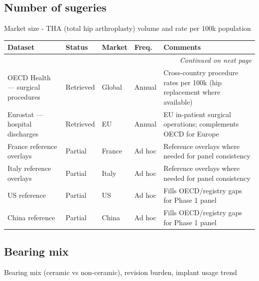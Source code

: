 \documentclass{article}
\begin{document}
\subsection{Number of sugeries}
Market size - THA (total hip arthroplasty) volume and rate per 100k population\\[0.5em]

\small
\setlength{\tabcolsep}{4pt}
\renewcommand{\arraystretch}{1.15}
\begin{longtable}{@{}p{3.0cm}p{2.0cm}p{2.1cm}p{1.9cm}p{5.8cm}@{}}
\toprule
\textbf{Dataset} & \textbf{Status} & \textbf{Market} & \textbf{Freq.} & \textbf{Comments} \\
\midrule
\endhead
\midrule
\multicolumn{5}{r}{\textit{Continued on next page}} \\
\endfoot
\bottomrule
\endlastfoot
OECD Health — surgical procedures & \textcolor{green!60!black}{Retrieved} & Global & Annual & Cross-country procedure rates per 100k (hip replacement where available) \\
Eurostat — hospital discharges & \textcolor{green!60!black}{Retrieved} & EU & Annual & EU in-patient surgical operations; complements OECD for Europe \\
France reference overlays & \textcolor{orange!85!black}{Partial} & France & Ad hoc & Reference overlays where needed for panel consistency \\
Italy reference overlays & \textcolor{orange!85!black}{Partial} & Italy & Ad hoc & Reference overlays where needed for panel consistency \\
US reference & \textcolor{orange!85!black}{Partial} & US & Ad hoc & Fills OECD/registry gaps for Phase 1 panel \\
China reference & \textcolor{orange!85!black}{Partial} & China & Ad hoc & Fills OECD/registry gaps for Phase 1 panel \\
\end{longtable}
\normalsize

\subsection{Bearing mix}
Bearing mix (ceramic vs non-ceramic), revision burden, implant usage trend\\[0.5em]
\end{document}
